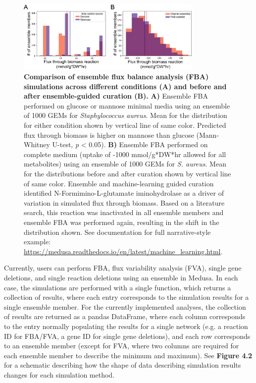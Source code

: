 \documentclass[11pt,twocolumn,notitlepage,openany,twoside]{book}
\begin{document}
\begin{refsection}
\begin{figure}[tb]
\centering
\includegraphics[width=0.8\textwidth]{ch4_fig3}
\caption[ Comparison of ensemble flux balance analysis (FBA) simulations across different conditions (A) and before and after ensemble-guided curation (B).]{\textbf{ Comparison of ensemble flux balance analysis (FBA) simulations across different conditions (A) and before and after ensemble-guided curation (B).} \textbf{A)} Ensemble FBA performed on glucose or mannose minimal media using an ensemble of 1000 GEMs for \textit{Staphylococcus aureus}. Mean for the distribution for either condition shown by vertical line of same color. Predicted flux through biomass is higher on mannose than glucose (Mann-Whitney U-test, \textit{p} < 0.05). \textbf{B)} Ensemble FBA performed on complete medium (uptake of -1000 mmol/g*DW*hr allowed for all metabolites) using an ensemble of 1000 GEMs for \textit{S. aureus}. Mean for the distributions before and after curation shown by vertical line of same color. Ensemble and machine-learning guided curation identified N-Formimino-L-glutamate iminohydrolase as a driver of variation in simulated flux through biomass. Based on a literature search, this reaction was inactivated in all ensemble members and ensemble FBA was performed again, resulting in the shift in the distribution shown. See documentation for full narrative-style example: \url{https://medusa.readthedocs.io/en/latest/machine_learning.html}.}
\end{figure}

Currently, users can perform FBA, flux variability analysis (FVA), single gene deletions, and single reaction deletions using an ensemble in Medusa. In each case, the simulations are performed with a single function, which returns a collection of results, where each entry corresponds to the simulation results for a single ensemble member. For the currently implemented analyses, the collection of results are returned as a pandas DataFrame, where each column corresponds to the entry normally populating the results for a single network (e.g. a reaction ID for FBA/FVA, a gene ID for single gene deletions), and each row corresponds to an ensemble member (except for FVA, where two columns are required for each ensemble member to describe the minimum and maximum). See \textbf{Figure 4.2} for a schematic describing how the shape of data describing simulation results changes for each simulation method.


\end{refsection}
\end{document}
